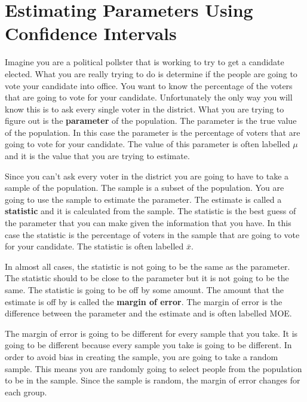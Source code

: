 \documentclass[
  letterpaper,
  DIV=11,
  numbers=noendperiod]{scrreprt}
\begin{document}

\chapter*{Estimating Parameters Using Confidence
Intervals}\label{estimating-parameters-using-confidence-intervals}


Imagine you are a political pollster that is working to try to get a
candidate elected. What you are really trying to do is determine if the
people are going to vote your candidate into office. You want to know
the percentage of the voters that are going to vote for your candidate.
Unfortunately the only way you will know this is to ask every single
voter in the district. What you are trying to figure out is the
\textbf{parameter} of the population. The parameter is the true value of
the population. In this case the parameter is the percentage of voters
that are going to vote for your candidate. The value of this parameter
is often labelled \(\mu\) and it is the value that you are trying to
estimate.

Since you can't ask every voter in the district you are going to have to
take a sample of the population. The sample is a subset of the
population. You are going to use the sample to estimate the parameter.
The estimate is called a \textbf{statistic} and it is calculated from
the sample. The statistic is the best guess of the parameter that you
can make given the information that you have. In this case the statistic
is the percentage of voters in the sample that are going to vote for
your candidate. The statistic is often labelled \(\bar{x}\).

In almost all cases, the statistic is not going to be the same as the
parameter. The statistic should to be close to the parameter but it is
not going to be the same. The statistic is going to be off by some
amount. The amount that the estimate is off by is called the
\textbf{margin of error}. The margin of error is the difference between
the parameter and the estimate and is often labelled MOE.

The margin of error is going to be different for every sample that you
take. It is going to be different because every sample you take is going
to be different. In order to avoid bias in creating the sample, you are
going to take a random sample. This means you are randomly going to
select people from the population to be in the sample. Since the sample
is random, the margin of error changes for each group.
\end{document}
